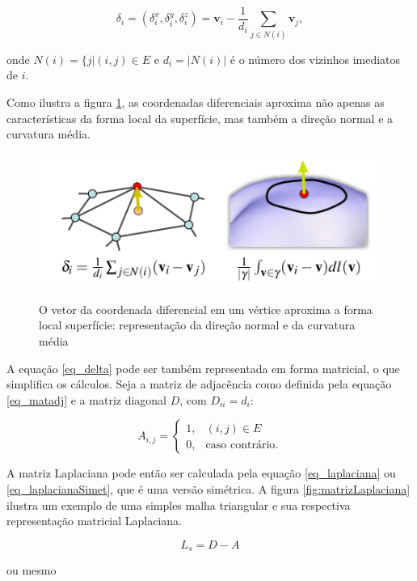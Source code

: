 \documentclass[
	12pt,				%
	oneside,			%
	a4paper,			%
	sumario=tradicional,
	english,			%
	french,				%
	spanish,			%
	brazil,				%
]{abntex2}
\begin{document}
\begin{equation}
    \delta_i = (\delta_i^x, \delta_i^y, \delta_i^z) = \mathbf{v}_i - \frac{1}{d_i} \sum_{j \in N(i)} \mathbf{v}_j,
    \label{eq_delta}
\end{equation}

\noindent onde $N(i) = \{j|(i,j) \in E$ e $d_i = |N(i)|$ é o número dos vizinhos imediatos de $i$. 

Como ilustra a figura \ref{fig:coordDif}, as coordenadas diferenciais aproxima não apenas as características da forma local da superfície, mas também a direção normal e a curvatura média. 

\begin{figure}[htb]
\centering
    \caption{O vetor da coordenada diferencial em um vértice aproxima a forma local superfície: representação da direção normal e da curvatura média}
    \includegraphics[width=.5\linewidth]{./img/difcoord.png}
    \label{fig:coordDif}
\end{figure}


A equação \ref{eq_delta} pode ser também representada em forma matricial, o que simplifica os cálculos. Seja a matriz de adjacência como definida pela equação \ref{eq_matadj}  e a matriz diagonal $D$, com $D_{ii} = d_i$:

\begin{equation}
    A_{i,j} = \begin{cases}
        1, & (i,j) \in E\\
        0, & \text{caso contrário}.
        \end{cases}
     \label{eq_matadj}
\end{equation}

A matriz Laplaciana pode então ser calculada pela equação \ref{eq_laplaciana} ou \ref{eq_laplacianaSimet}, que é uma versão simétrica. A figura \ref{fig:matrizLaplaciana} ilustra um exemplo de uma simples malha triangular e sua respectiva representação matricial Laplaciana.

\begin{equation}
    L_s = D-A
    \label{eq_laplaciana}
\end{equation}

\noindent ou mesmo
\end{document}
